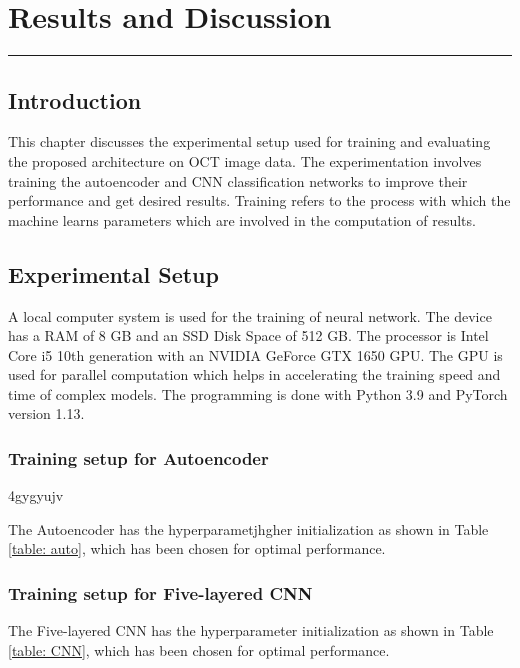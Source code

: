 \chapter{Results and Discussion}
\label{chapter:results} 
\noindent\rule{\linewidth}{2pt}

\section{Introduction}
This chapter discusses the experimental setup used for training and evaluating the proposed architecture on OCT image data. The experimentation involves training the autoencoder and CNN classification networks to improve their performance and get desired results. Training refers to the process with which the machine learns parameters which are involved in the computation of results.


\section{Experimental Setup}
A local computer system is used for the training of neural network. The device has a RAM of 8 GB and an SSD Disk Space of 512 GB. The processor is Intel Core i5 10th generation with an NVIDIA GeForce GTX 1650 GPU. The GPU is used for parallel computation which helps in accelerating the training speed and time of complex models. The programming is done with Python 3.9 and PyTorch version 1.13.

\subsection{Training setup for Autoencoder}
\vspace{1em}4gygyujv 
  
The Autoencoder has the hyperparametjhgher initialization as shown in Table \ref{table: auto}, which has been chosen for optimal performance.

\subsection{Training setup for Five-layered CNN}
\vspace{1em}
The Five-layered CNN has the  hyperparameter initialization as shown in Table \ref{table: CNN},  which has been chosen for optimal performance.
\newpage

